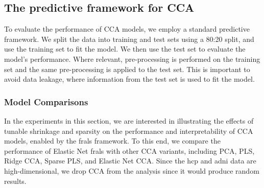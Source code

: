 \subsection{The predictive framework for CCA}\label{subsec:the-predictive-framework-for-cca}

To evaluate the performance of CCA models, we employ a standard predictive framework.
We split the data into training and test sets using a 80:20 split, and use the training set to fit the model.
We then use the test set to evaluate the model's performance.
Where relevant, pre-processing is performed on the training set and the same pre-processing is applied to the test set.
This is important to avoid data leakage, where information from the test set is used to fit the model.

\subsubsection{Model Comparisons}
In the experiments in this section, we are interested in illustrating the effects of tunable shrinkage and sparsity on the performance and interpretability of CCA models, enabled by the \acrshort{frals} framework.
To this end, we compare the performance of Elastic Net \acrshort{frals} with other CCA variants, including PCA, PLS, Ridge CCA, Sparse PLS, and Elastic Net CCA\@.
Since the \acrshort{hcp} and \acrshort{adni} data are high-dimensional, we drop CCA from the analysis since it would produce random results.

